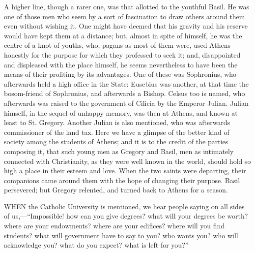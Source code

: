 A higher line, though a rarer one, was that allotted to the
youthful Basil. He was one of those men who seem by a sort of
fascination to draw others around them even without wishing it. One
might have deemed that his gravity and his reserve would have kept
them at a distance; but, almost in spite of himself, he was the
centre of a knot of youths, who, pagans as most of them were, used
Athens honestly for the purpose for which they professed to seek it;
and, disappointed and displeased with the place himself, he seems
nevertheless to have been the means of their profiting by its
advantages. One of these was Sophronius, who afterwards held a high
office in the State: Eusebius was another, at that time the
bosom-friend of Sophronius, and afterwards a Bishop. Celsus too is
named, who afterwards was raised to the government of Cilicia by the
Emperor Julian. Julian himself, in the sequel of unhappy memory, was
then at Athens, and known at least to St. Gregory. Another Julian is
also mentioned, who was afterwards commissioner of the land tax. Here
we have a glimpse of the better kind of society among the students of
Athens; and it is to the credit of the parties composing it, that such
young men as Gregory and Basil, men as intimately connected with
Christianity, as they were well known in the world, should hold so
high a place in their esteem and love. When the two saints were
departing, their companions came around them with the hope of changing
their purpose. Basil persevered; but Gregory relented, and turned back
to Athens for a season.


WHEN the Catholic University is
mentioned, we hear people saying on all sides of us,—``Impossible!
how can you give degrees? what will your degrees be worth? where are
your endowments? where are your edifices? where will you find
students? what will government have to say to you? who wants you? who
will acknowledge you? what do you expect? what is left for you?''

